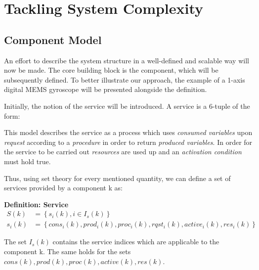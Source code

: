 \chapter{Tackling System Complexity}

\section{Component Model}

An effort to describe the system structure in a well-defined and scalable way will now be made. The core building block is the component, which will be subsequently defined. To better illustrate our approach, the example of a 1-axis digital MEMS gyroscope will be presented alongside the definition.

Initially, the notion of the service will be introduced. A service is a 6-tuple of the form:


This model describes the service as a process which uses \textit{consumed variables} upon \textit{request} according to a \textit{procedure} in order to return \textit{produced variables}. In order for the service to be carried out \textit{resources} are used up and an \textit{activation condition} must hold true.

Thus, using set theory for every mentioned quantity, we can define a set of services provided by a component k as:

\textbf{Definition: Service}
\begin{align*}
S(k) &= \left\{s_i(k),i\in I_s(k)\right\} \\
s_i(k) &= \left\{cons_i(k),prod_i(k),proc_i(k),rqst_i(k),active_i(k),res_i(k)\right\}
\end{align*}

The set $I_s(k)$ contains the service indices which are applicable to the component k. The same holds for the sets $cons(k),prod(k),proc(k),active(k),res(k)$.

